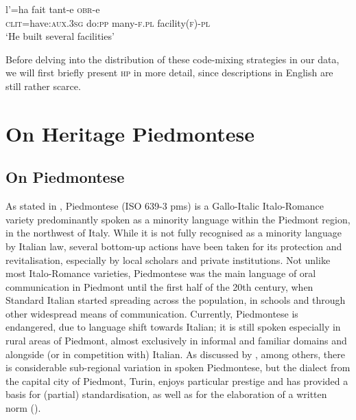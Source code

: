 \documentclass[output=paper]{langscibook}
\begin{document}
\ea%
    \label{ex:goria:7}
    \gll l’=ha fait tant-e \textsc{obr}{}-e\\
         \textsc{clit}=have:\textsc{aux}.\textsc{3sg}  do:\textsc{pp}  many-\textsc{f}.\textsc{pl} facility(\textsc{f})-\textsc{pl}\\
    \glt ‘He built several facilities’
\z %

Before delving into the distribution of these code-mixing strategies in our data, we will first briefly present \textsc{hp} in more detail, since descriptions in English are still rather scarce.

\section{On Heritage Piedmontese}\label{sec:goria:3}
\subsection{On Piedmontese}

As stated in , Piedmontese (ISO 639-3 pms) is a Gallo-Italic Italo-Romance variety predominantly spoken as a minority language within the Piedmont region, in the northwest of Italy. While it is not fully recognised as a minority language by Italian law, several bottom-up actions have been taken for its protection and revitalisation, especially by local scholars and private institutions. Not unlike most Italo-Romance varieties, Piedmontese was the main language of oral communication in Piedmont until the first half of the 20th century, when Standard Italian started spreading across the population, in schools and through other widespread means of communication. Currently, Piedmontese is endangered, due to language shift towards Italian; it is still spoken especially in rural areas of Piedmont, almost exclusively in informal and familiar domains and alongside (or in competition with) Italian. As discussed by \citet {Regis2011,Regis2013,RegisRivoirainpress}, among others, there is considerable sub-regional variation in spoken Piedmontese, but the dialect from the capital city of Piedmont, Turin, enjoys particular prestige and has provided a basis for (partial) standardisation, as well as for the elaboration of a written norm (\citealt{BreroBertodatti1988}).
\end{document}
